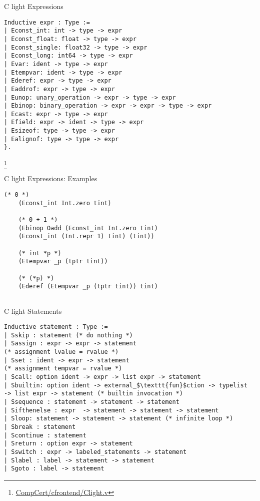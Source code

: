 \documentclass{beamer}
\begin{document}
 \begin{frame}[fragile]{C light Expressions}
   
  \begin{lstlisting}[language=Coq]
Inductive expr : Type :=
| Econst_int: int -> type -> expr      
| Econst_float: float -> type -> expr 
| Econst_single: float32 -> type -> expr 
| Econst_long: int64 -> type -> expr 
| Evar: ident -> type -> expr 
| Etempvar: ident -> type -> expr 
| Ederef: expr -> type -> expr 
| Eaddrof: expr -> type -> expr
| Eunop: unary_operation -> expr -> type -> expr
| Ebinop: binary_operation -> expr -> expr -> type -> expr
| Ecast: expr -> type -> expr   
| Efield: expr -> ident -> type -> expr
| Esizeof: type -> type -> expr 
| Ealignof: type -> type -> expr
}. 
\end{lstlisting}\footnote{\url{CompCert/cfrontend/Clight.v}}


\end{frame}


    

\begin{frame}[fragile]{C light Expressions: Examples}

  \begin{lstlisting}[language=Coq]
    (* 0 *)
    (Econst_int Int.zero tint) 

    (* 0 + 1 *)
    (Ebinop Oadd (Econst_int Int.zero tint)
    (Econst_int (Int.repr 1) tint) (tint))

    (* int *p *)
    (Etempvar _p (tptr tint)) 
    
    (* (*p) *)
    (Ederef (Etempvar _p (tptr tint)) tint)


  \end{lstlisting}
  


\end{frame}

\begin{frame}[fragile]{C light Statements}

  \begin{lstlisting}[language=Coq]
Inductive statement : Type :=
| Sskip : statement (* do nothing *)
| Sassign : expr -> expr -> statement
(* assignment lvalue = rvalue *)
| Sset : ident -> expr -> statement
(* assignment tempvar = rvalue *)
| Scall: option ident -> expr -> list expr -> statement
| Sbuiltin: option ident -> external_$\texttt{fun}$ction -> typelist
-> list expr -> statement (* builtin invocation *)
| Ssequence : statement -> statement -> statement
| Sifthenelse : expr  -> statement -> statement -> statement
| Sloop: statement -> statement -> statement (* infinite loop *)
| Sbreak : statement
| Scontinue : statement
| Sreturn : option expr -> statement
| Sswitch : expr -> labeled_statements -> statement
| Slabel : label -> statement -> statement
| Sgoto : label -> statement

  \end{lstlisting}
  


\end{frame}
\end{document}
